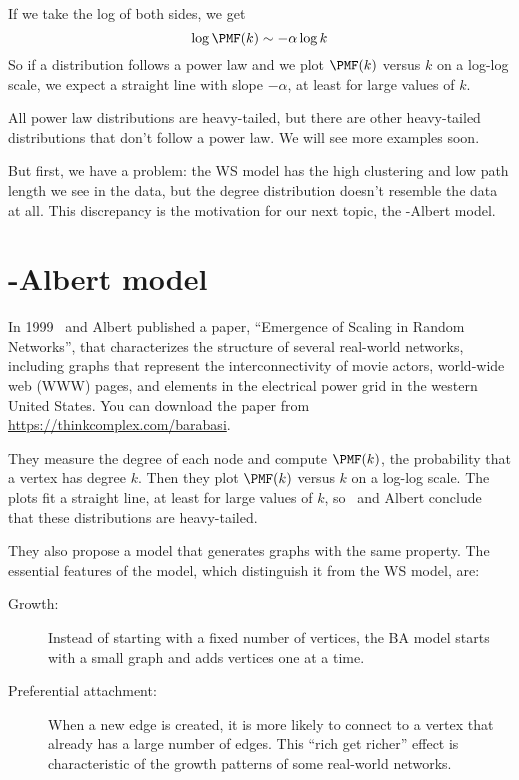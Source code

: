 \documentclass[12pt]{book}
\theoremstyle{exercise}
\begin{document}
If we take the log of both sides, we get
%
\[ \log \PMF(k) \sim -\alpha \log k \]
%
So if a distribution follows a power law and we plot $\PMF(k)$ versus
$k$ on a log-log scale, we expect a straight line with slope
$-\alpha$, at least for large values of $k$.

All power law distributions are heavy-tailed, but there are other
heavy-tailed distributions that don't follow a power law.  We will
see more examples soon.

But first, we have a problem: the WS model has the high clustering
and low path length we see in the data, but the degree distribution
doesn't resemble the data at all.  This discrepancy is the motivation
for our next topic, the \Barabasi-Albert model.


\section{\Barabasi-Albert model}
\label{scale.free}

In 1999 \Barabasi~and Albert published a paper,
``Emergence of Scaling in Random Networks'', that characterizes the
structure of several real-world networks,
including graphs that represent the interconnectivity of movie actors,
world-wide web (WWW) pages, and elements in the electrical power grid
in the western United States.  You can download the paper from
\url{https://thinkcomplex.com/barabasi}.


They measure the degree of each node and compute $\PMF(k)$, the
probability that a vertex has degree $k$.  Then they plot $\PMF(k)$
versus $k$ on a log-log scale.  The plots fit a
straight line, at least for large values of $k$,
so \Barabasi~and Albert conclude that these
distributions are heavy-tailed.

They also propose a model that generates graphs with the same
property.  The essential features of the model, which distinguish it
from the WS model, are:


\begin{description}

\item[Growth:]  Instead of starting with a fixed number of vertices,
the BA model starts with a small graph and adds vertices one at a time.

\item[Preferential attachment:] When a new edge is created, it is
more likely to connect to a vertex that already has a large number
of edges.  This ``rich get richer'' effect is characteristic of
the growth patterns of some real-world networks.


\end{description}
\end{document}
